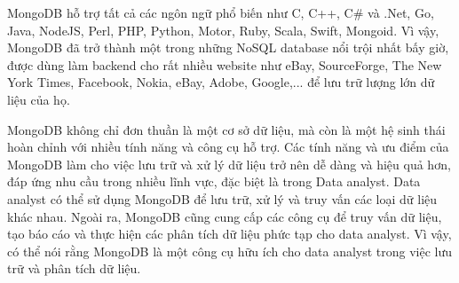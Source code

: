 MongoDB hỗ trợ tất cả các ngôn ngữ phổ biến như C, C++, C\# và .Net, Go, Java, NodeJS, Perl, PHP, Python, Motor, Ruby, Scala, Swift, Mongoid. Vì vậy, MongoDB đã trở thành một trong những NoSQL database nổi trội nhất bấy giờ, được dùng làm backend cho rất nhiều website như eBay, SourceForge, The New York Times, Facebook, Nokia, eBay, Adobe, Google,... để lưu trữ lượng lớn dữ liệu của họ.

MongoDB không chỉ đơn thuần là một cơ sở dữ liệu, mà còn là một hệ sinh thái hoàn chỉnh với nhiều tính năng và công cụ hỗ trợ. Các tính năng và ưu điểm của MongoDB làm cho việc lưu trữ và xử lý dữ liệu trở nên dễ dàng và hiệu quả hơn, đáp ứng nhu cầu trong nhiều lĩnh vực, đặc biệt là trong Data analyst. Data analyst có thể sử dụng MongoDB để lưu trữ, xử lý và truy vấn các loại dữ liệu khác nhau. Ngoài ra, MongoDB cũng cung cấp các công cụ để truy vấn dữ liệu, tạo báo cáo và thực hiện các phân tích dữ liệu phức tạp cho data analyst. Vì vậy, có thể nói rằng MongoDB là một công cụ hữu ích cho data analyst trong việc lưu trữ và phân tích dữ liệu.

